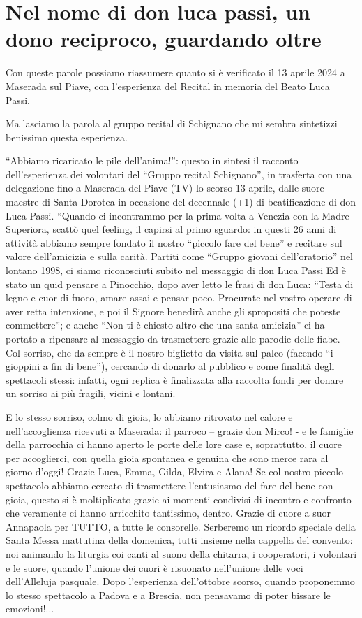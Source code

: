 \section{Nel nome di don luca passi, un dono reciproco, guardando oltre}
 
Con queste parole possiamo riassumere quanto si è verificato il 13 aprile 2024 a Maserada sul Piave, con l’esperienza del Recital in memoria del Beato Luca Passi.

Ma lasciamo la parola al gruppo recital di Schignano che mi sembra sintetizzi benissimo questa esperienza.

“Abbiamo ricaricato le pile dell’anima!”: questo in sintesi il racconto dell’esperienza dei volontari del “Gruppo recital Schignano”, in trasferta con una delegazione fino a Maserada del Piave (TV) lo scorso 13 aprile, dalle suore maestre di Santa Dorotea in occasione del decennale (+1) di beatificazione di don Luca Passi. “Quando ci incontrammo per la prima volta a Venezia con la Madre Superiora, scattò quel feeling, il capirsi al primo sguardo: in questi 26 anni di attività abbiamo sempre fondato il nostro “piccolo fare del bene” e recitare sul valore dell’amicizia e sulla carità. Partiti come “Gruppo giovani dell’oratorio” nel lontano 1998, ci siamo riconosciuti subito nel messaggio di don Luca Passi
Ed è stato un quid pensare a Pinocchio, dopo aver letto le frasi di don Luca: “Testa di legno e cuor di fuoco, amare assai e pensar poco. Procurate nel vostro operare di aver retta intenzione, e poi il Signore benedirà anche gli spropositi che poteste commettere”; e anche “Non ti è chiesto altro che una santa amicizia” ci ha portato a ripensare al messaggio da trasmettere grazie alle parodie delle fiabe. Col sorriso, che da sempre è il nostro biglietto da visita sul palco (facendo “i gioppini a fin di bene”), cercando di donarlo al pubblico e come finalità degli spettacoli stessi: infatti, ogni replica è finalizzata alla raccolta fondi per donare un sorriso ai più fragili, vicini e lontani.

E lo stesso sorriso, colmo di gioia, lo abbiamo ritrovato nel calore e nell’accoglienza ricevuti a Maserada: il parroco – grazie don Mirco! - e le famiglie della parrocchia ci hanno aperto le porte delle lore case e, soprattutto, il cuore per accoglierci, con quella gioia spontanea e genuina che sono merce rara al giorno d’oggi! Grazie Luca, Emma, Gilda, Elvira e Alana! Se col nostro piccolo spettacolo abbiamo cercato di trasmettere l’entusiasmo del fare del bene con gioia, questo si è moltiplicato grazie ai momenti condivisi di incontro e confronto che veramente ci hanno arricchito tantissimo, dentro.
Grazie di cuore a suor Annapaola per TUTTO, a tutte le consorelle. Serberemo un ricordo speciale della Santa  Messa mattutina della domenica, tutti insieme nella cappella del convento: noi animando la liturgia coi canti al suono della chitarra, i cooperatori, i volontari e le suore, quando l’unione dei cuori è risuonato nell’unione delle voci dell’Alleluja pasquale. Dopo l’esperienza dell’ottobre scorso, quando proponemmo lo stesso spettacolo a Padova e a Brescia, non pensavamo di poter bissare le emozioni!...

